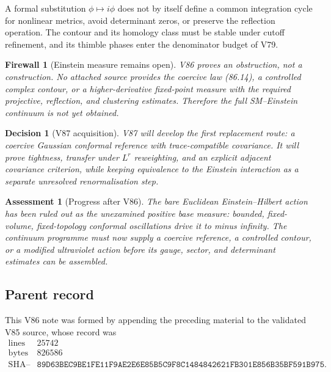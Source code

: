 \documentclass[11pt]{article}
\newtheorem{assessment}[theorem]{Assessment}
\newtheorem{firewall}[theorem]{Firewall}
\newtheorem{decision}[theorem]{Decision}
\begin{document}
\begin{warning}
\label{warn:v11v86-contour}
A formal substitution \(\phi\mapsto i\phi\) does not by itself define
a common integration cycle for nonlinear metrics, avoid determinant
zeros, or preserve the reflection operation.  The contour and its
homology class must be stable under cutoff refinement, and its thimble
phases enter the denominator budget of V79.
\end{warning}

\begin{firewall}[Einstein measure remains open]
\label{fire:v11v86-boundary}
V86 proves an obstruction, not a construction.  No attached source
provides the coercive law (86.14), a controlled complex contour, or a
higher-derivative fixed-point measure with the required projective,
reflection, and clustering estimates.  Therefore the full
SM--Einstein continuum is not yet obtained.
\end{firewall}

\begin{decision}[V87 acquisition]
\label{dec:v11v86-next}
V87 will develop the first replacement route: a coercive Gaussian
conformal reference with trace-compatible covariance.  It will prove
tightness, transfer under \(L^r\) reweighting, and an explicit
adjacent covariance criterion, while keeping equivalence to the
Einstein interaction as a separate unresolved renormalisation step.
\end{decision}

\begin{assessment}[Progress after V86]
\label{ass:v11v86-status}
The bare Euclidean Einstein--Hilbert action has been ruled out as the
unexamined positive base measure: bounded, fixed-volume,
fixed-topology conformal oscillations drive it to minus infinity.
The continuum programme must now supply a coercive reference,
a controlled contour, or a modified ultraviolet action before its
gauge, sector, and determinant estimates can be assembled.
\end{assessment}

\subsection{Parent record}

This V86 note was formed by appending the preceding material to the
validated V85 source, whose record was
\[
\begin{array}{c|c}
\text{lines}&25742\\
\text{bytes}&826586\\
\text{SHA--256}&
\texttt{89D63BEC9BE1FE11F9AE2E6E85B5C9F8C1484842621FB301E856B35BF591B975}.
\end{array}                                                     \tag{86.15}
\]
\end{document}
